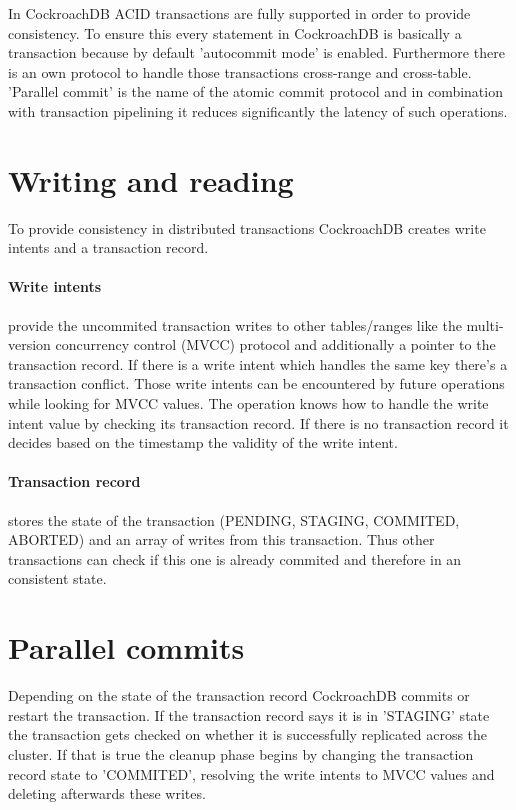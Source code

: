 \documentclass[12pt,a4paper]{article}
\begin{document}
In CockroachDB ACID transactions are fully supported in order to provide consistency. To ensure this every statement in 
CockroachDB is basically a transaction because by default 'autocommit mode' is enabled. Furthermore there is an own protocol
to handle those transactions cross-range and cross-table. 'Parallel commit' is the name of the atomic commit protocol and in
combination with transaction pipelining it reduces significantly the latency of such operations.

\section{Writing and reading}
To provide consistency in distributed transactions CockroachDB creates write intents and a transaction record.

\paragraph{Write intents} provide the uncommited transaction writes to other tables/ranges like the multi-version concurrency 
control (MVCC) protocol and additionally a pointer to the transaction record. If there is a write intent which handles the
same key there's a transaction conflict. Those write intents can be encountered by future operations while looking for 
MVCC values. The operation knows how to handle the write intent value by checking its transaction record. If there is no 
transaction record it decides based on the timestamp the validity of the write intent. 

\paragraph{Transaction record} stores the state of the transaction (PENDING, STAGING, COMMITED, ABORTED) and an array of
writes from this transaction. Thus other transactions can check if this one is already commited and therefore in an
consistent state.

\section{Parallel commits}
Depending on the state of the transaction record CockroachDB commits or restart the transaction. If the transaction record
says it is in 'STAGING' state the transaction gets checked on whether it is successfully replicated across the cluster. 
If that is true the cleanup phase begins by changing the transaction record state to 'COMMITED', resolving the write intents 
to MVCC values and deleting afterwards these writes.
\end{document}
